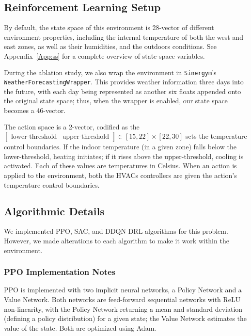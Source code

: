 \documentclass[12pt]{article}
\begin{document}
\subsection{Reinforcement Learning Setup}\label{method:drl_setup}

By default, the state space of this environment is 28-vector of different environment properties, including the internal temperature of both the west and east zones, as well as their humidities, and the outdoors conditions. See Appendix~\ref{App:ss} for a complete overview of state-space variables. 

During the ablation study, we also wrap the environment in \texttt{Sinergym}'s \texttt{WeatherForecastingWrapper}. This provides weather information three days into the future, with each day being represented as another six floats appended onto the original state space; thus, when the wrapper is enabled, our state space becomes a 46-vector. 

The action space is a 2-vector, codified as the $\begin{bmatrix}
    \text{lower-threshold} & \text{upper-threshold}
\end{bmatrix} \in [15, 22] \times [22, 30]$ sets the temperature control boundaries. If the indoor temperature (in a given zone) falls below the lower-threshold, heating initiates; if it rises above the upper-threshold, cooling is activated. Each of these values are temperatures in Celsius. When an action is applied to the environment, both the HVACs controllers are given the action's temperature control boundaries. 

\subsection{Algorithmic Details} \label{method:algo_details}

We implemented PPO, SAC, and DDQN DRL algorithms for this problem. However, we made alterations to each algorithm to make it work within the environment. 

\subsubsection{PPO Implementation Notes}
PPO is implemented with two implicit neural networks, a Policy Network and a Value Network. Both networks are feed-forward sequential networks with ReLU non-linearity, with the Policy Network returning a mean and standard deviation (defining a policy distribution) for a given state; the Value Network estimates the value of the state. Both are optimized using Adam.
\end{document}
